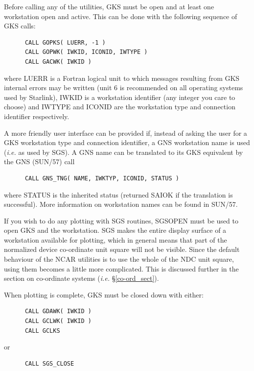 \documentclass[twoside,11pt]{article}
\newcommand{\xref}[3]{#1}
\renewcommand{\_}{\texttt{\symbol{95}}}
\begin{document}
Before calling any of the utilities, GKS must be open and at least one
workstation open and active. 
This can be done with the following sequence of GKS calls:

\begin{verbatim}
      CALL GOPKS( LUERR, -1 )
      CALL GOPWK( IWKID, ICONID, IWTYPE )
      CALL GACWK( IWKID )
\end{verbatim}

where LUERR is a Fortran logical unit to which messages resulting from
GKS internal errors may be written (unit 6 is recommended on all operating
systems used by Starlink), IWKID is a workstation identifier (any integer you
care to choose) and IWTYPE and ICONID are the workstation type and connection
identifier respectively.

A more friendly user interface can be provided if, instead of asking the
user for a GKS workstation type and connection identifier, a GNS workstation
name is used (\emph{i.e.} as used by SGS).
A GNS name can be translated to its GKS equivalent by the GNS (\xref{SUN/57}{sun57}{}) call

\begin{verbatim}
      CALL GNS_TNG( NAME, IWKTYP, ICONID, STATUS )
\end{verbatim}

where STATUS is the inherited status (returned SAI\_\_OK if the translation is 
successful). 
More information on workstation names can be found in \xref{SUN/57}{sun57}{}.

If you wish to do any plotting with SGS routines, SGS\_OPEN must be used to
open GKS and the workstation.
SGS makes the entire display surface of a workstation available for plotting,
which in general means that part of the normalized device co-ordinate unit
square will not be visible.
Since the default behaviour of the NCAR utilities is to use the whole of the
NDC unit square, using them becomes a little more complicated.
This is discussed further in the section on co-ordinate systems
(\emph{i.e.} \S\ref{co-ord_sect}).

When plotting is complete, GKS must be closed down with either:

\begin{verbatim}
      CALL GDAWK( IWKID )
      CALL GCLWK( IWKID )
      CALL GCLKS
\end{verbatim}

or

\begin{verbatim}
      CALL SGS_CLOSE
\end{verbatim}
\end{document}
